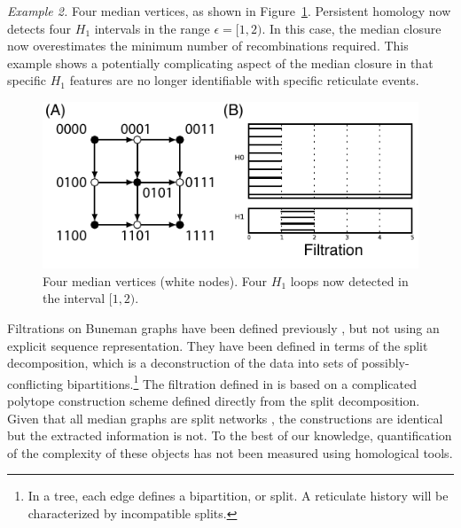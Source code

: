\emph{Example 2.}
Four median vertices, as shown in Figure~\ref{fig:example_2_revisited}.
Persistent homology now detects four $H_{1}$ intervals in the range $\epsilon=[1,2)$.
In this case, the median closure now overestimates the minimum number of recombinations required.
This example shows a potentially complicating aspect of the median closure in that specific $H_1$ features are no longer identifiable with specific reticulate events.

\begin{figure}
\centering
\includegraphics[width=\columnwidth]{fig/complex_construction/example_2_revisited.pdf}
\caption{Four median vertices (white nodes). Four $H_1$ loops now detected in the interval $[1,2)$.}
\label{fig:example_2_revisited}
\end{figure}

Filtrations on Buneman graphs have been defined previously \citep{Dress:1997}, but not using an explicit sequence representation.
They have been defined in terms of the split decomposition, which is a deconstruction of the data into sets of possibly-conflicting bipartitions.\footnote{In a tree, each edge defines a bipartition, or split. A reticulate history will be characterized by incompatible splits.}
The filtration defined in \citet{Dress:1997} is based on a complicated polytope construction scheme defined directly from the split decomposition.
Given that all median graphs are split networks \citep{Huson:2010}, the constructions are identical but the extracted information is not.
To the best of our knowledge, quantification of the complexity of these objects has not been measured using homological tools.

